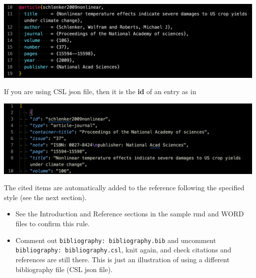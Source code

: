 \documentclass[
  letterpaper,
  DIV=11,
  numbers=noendperiod]{scrreprt}
\providecommand{\tightlist}{%
  \setlength{\itemsep}{0pt}\setlength{\parskip}{0pt}}\usepackage{longtable,booktabs,array}
\begin{document}
\includegraphics[width=1\textwidth,height=\textheight]{assets/pictures/bib-example.png}

If you are using CSL json file, then it is the \textbf{id} of an entry
as in

\includegraphics[width=1\textwidth,height=\textheight]{assets/pictures/bib-csl-example.png}

The cited items are automatically added to the reference following the
specified style (see the next section).

\begin{tcolorbox}[enhanced jigsaw, colframe=quarto-callout-note-color-frame, toptitle=1mm, colbacktitle=quarto-callout-note-color!10!white, toprule=.15mm, colback=white, arc=.35mm, bottomtitle=1mm, opacitybacktitle=0.6, breakable, left=2mm, coltitle=black, leftrule=.75mm, title=\textcolor{quarto-callout-note-color}{\faInfo}\hspace{0.5em}{Note}, rightrule=.15mm, titlerule=0mm, opacityback=0, bottomrule=.15mm]

\begin{itemize}
\tightlist
\item
  See the Introduction and Reference sections in the sample rmd and WORD
  files to confirm this rule.
\item
  Comment out \texttt{bibliography:\ bibliography.bib} and uncomment
  \texttt{bibliography:\ bibliography.csl}, knit again, and check
  citations and references are still there. This is just an illustration
  of using a different bibliography file (CSL json file).
\end{itemize}

\end{tcolorbox}
\end{document}

